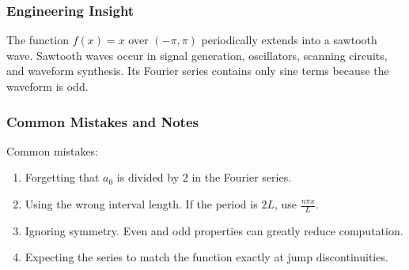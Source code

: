 \subsubsection*{Engineering Insight}

\begin{noteBox}
    The function $f(x)=x$ over $(-\pi,\pi)$ periodically extends into a sawtooth wave. Sawtooth waves occur in signal generation, oscillators, scanning circuits, and waveform synthesis. Its Fourier series contains only sine terms because the waveform is odd.
\end{noteBox}

\subsubsection*{Common Mistakes and Notes}

\begin{conceptbox}
    Common mistakes:
    \begin{enumerate}
        \item Forgetting that $a_0$ is divided by $2$ in the Fourier series.
        \item Using the wrong interval length. If the period is $2L$, use $\frac{n\pi x}{L}$.
        \item Ignoring symmetry. Even and odd properties can greatly reduce computation.
        \item Expecting the series to match the function exactly at jump discontinuities.
    \end{enumerate}
\end{conceptbox}